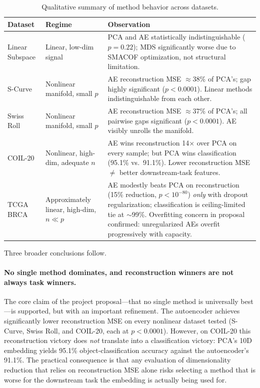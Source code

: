 \documentclass[11pt]{article}
\begin{document}
\begin{table}[H]
\centering
\caption{Qualitative summary of method behavior across datasets.}
\label{tab:overall}
\begin{tabular}{p{3.0cm} p{3.5cm} p{8.2cm}}
\toprule
\textbf{Dataset} & \textbf{Regime} & \textbf{Observation} \\
\midrule
Linear Subspace & Linear, low-dim signal & PCA and AE statistically indistinguishable ($p=0.22$); MDS significantly worse due to SMACOF optimization, not structural limitation. \\
S-Curve         & Nonlinear manifold, small $p$ & AE reconstruction MSE $\approx 38\%$ of PCA's; gap highly significant ($p<0.0001$). Linear methods indistinguishable from each other. \\
Swiss Roll      & Nonlinear manifold, small $p$ & AE reconstruction MSE $\approx 37\%$ of PCA's; all pairwise gaps significant ($p<0.0001$). AE visibly unrolls the manifold. \\
COIL-20         & Nonlinear, high-dim, adequate $n$ & AE wins reconstruction 14$\times$ over PCA on every sample; but PCA wins classification (95.1\% vs.\ 91.1\%). Lower reconstruction MSE $\neq$ better downstream-task features. \\
TCGA BRCA       & Approximately linear, high-dim, $n \ll p$ & AE modestly beats PCA on reconstruction (15\% reduction, $p < 10^{-80}$) \emph{only} with dropout regularization; classification is ceiling-limited tie at $\sim$99\%. Overfitting concern in proposal confirmed: unregularized AEs overfit progressively with capacity. \\
\bottomrule
\end{tabular}
\end{table}

Three broader conclusions follow.

\paragraph{No single method dominates, and reconstruction winners are not always task winners.} The core claim of the project proposal---that no single method is universally best---is supported, but with an important refinement. The autoencoder achieves significantly lower reconstruction MSE on every nonlinear dataset tested (S-Curve, Swiss Roll, and COIL-20, each at $p < 0.0001$). However, on COIL-20 this reconstruction victory does \emph{not} translate into a classification victory: PCA's 10D embedding yields 95.1\% object-classification accuracy against the autoencoder's 91.1\%. The practical consequence is that any evaluation of dimensionality reduction that relies on reconstruction MSE alone risks selecting a method that is worse for the downstream task the embedding is actually being used for.
\end{document}
